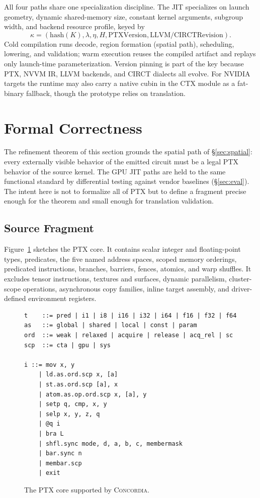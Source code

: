 \documentclass[sigplan,nonacm]{acmart}
\newcommand{\sys}{\textsc{Concordia}\xspace}
\newcommand{\circt}{CIRCT\xspace}
\begin{document}
All four paths share one specialization discipline.  The JIT specializes on
launch geometry, dynamic shared-memory size, constant kernel arguments,
subgroup width, and backend resource profile, keyed by
\[
\kappa =
(\mathrm{hash}(K),\lambda,\eta,H,\mathrm{PTXVersion},
\mathrm{LLVM/CIRCTRevision}).
\]
Cold compilation runs decode, region formation (spatial path), scheduling,
lowering, and validation; warm execution reuses the compiled artifact and
replays only launch-time parameterization.  Version pinning is part of the
key because PTX, NVVM IR, LLVM backends, and \circt dialects all evolve.
For NVIDIA targets the runtime may also carry a native cubin in the CTX
module as a fat-binary fallback, though the prototype relies on
translation.

\section{Formal Correctness}
\label{sec:formal}

The refinement theorem of this section grounds the spatial path of
\S\ref{sec:spatial}: every externally visible behavior of the emitted
circuit must be a legal PTX behavior of the source kernel.  The GPU JIT
paths are held to the same functional standard by differential testing
against vendor baselines (\S\ref{sec:eval}).  The intent here is not to
formalize all of PTX but to define a fragment precise enough for the theorem
and small enough for translation validation.

\subsection{Source Fragment}
\label{sec:fragment}

Figure~\ref{fig:ptx-core} sketches the PTX core.  It contains scalar integer
and floating-point types, predicates, the five named address spaces, scoped
memory orderings, predicated instructions, branches, barriers, fences,
atomics, and warp shuffles.  It excludes tensor instructions, textures and
surfaces, dynamic parallelism, cluster-scope operations, asynchronous copy
families, inline target assembly, and driver-defined environment registers.

\begin{figure}[t]
\begin{lstlisting}
t    ::= pred | i1 | i8 | i16 | i32 | i64 | f16 | f32 | f64
as   ::= global | shared | local | const | param
ord  ::= weak | relaxed | acquire | release | acq_rel | sc
scp  ::= cta | gpu | sys

i ::= mov x, y
    | ld.as.ord.scp x, [a]
    | st.as.ord.scp [a], x
    | atom.as.op.ord.scp x, [a], y
    | setp q, cmp, x, y
    | selp x, y, z, q
    | @q i
    | bra L
    | shfl.sync mode, d, a, b, c, membermask
    | bar.sync n
    | membar.scp
    | exit
\end{lstlisting}
\caption{The PTX core supported by \sys.}
\label{fig:ptx-core}
\end{figure}
\end{document}
